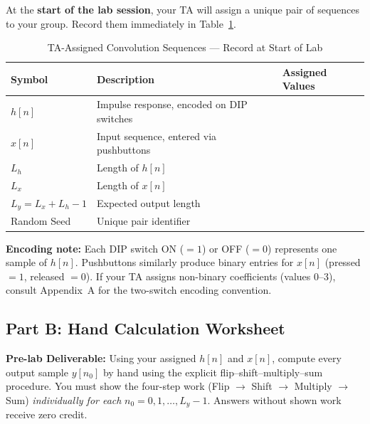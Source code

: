 \documentclass[11pt,letterpaper]{article}
\providecommand{\pldECE}[1]{\textcolor{BrickRed}{\textbf{Pre-lab Deliverable:} #1}}
\begin{document}
At the \textbf{start of the lab session}, your TA will assign a unique pair of sequences to your group. Record them immediately in Table~\ref{tab:assigned_seqs}.

\begin{table}[H]
    \centering
    \caption{TA-Assigned Convolution Sequences --- Record at Start of Lab}
    \label{tab:assigned_seqs}
    \begin{tabularx}{\linewidth}{l X l}
    \toprule
    \textbf{Symbol} & \textbf{Description} & \textbf{Assigned Values}\\
    \midrule
    $h[n]$ & Impulse response, encoded on DIP switches & \underline{\hspace{5cm}}\\[0.4cm]
    $x[n]$ & Input sequence, entered via pushbuttons & \underline{\hspace{5cm}}\\[0.4cm]
    $L_h$ & Length of $h[n]$ & \underline{\hspace{5cm}}\\[0.4cm]
    $L_x$ & Length of $x[n]$ & \underline{\hspace{5cm}}\\[0.4cm]
    $L_y = L_x + L_h - 1$ & Expected output length & \underline{\hspace{5cm}}\\[0.2cm]
    Random Seed & Unique pair identifier & \underline{\hspace{5cm}}\\
    \bottomrule
    \end{tabularx}
\end{table}

\noindent\textbf{Encoding note:} Each DIP switch ON ($= 1$) or OFF ($= 0$) represents one sample of $h[n]$. Pushbuttons similarly produce binary entries for $x[n]$ (pressed $= 1$, released $= 0$). If your TA assigns non-binary coefficients (values 0--3), consult Appendix~A for the two-switch encoding convention.

\subsection{Part B: Hand Calculation Worksheet}

\pldECE{Using your assigned $h[n]$ and $x[n]$, compute every output sample $y[n_0]$ by hand using the explicit flip--shift--multiply--sum procedure. You must show the four-step work (Flip $\to$ Shift $\to$ Multiply $\to$ Sum) \emph{individually for each} $n_0 = 0, 1, \ldots, L_y - 1$. Answers without shown work receive zero credit.}
\end{document}
